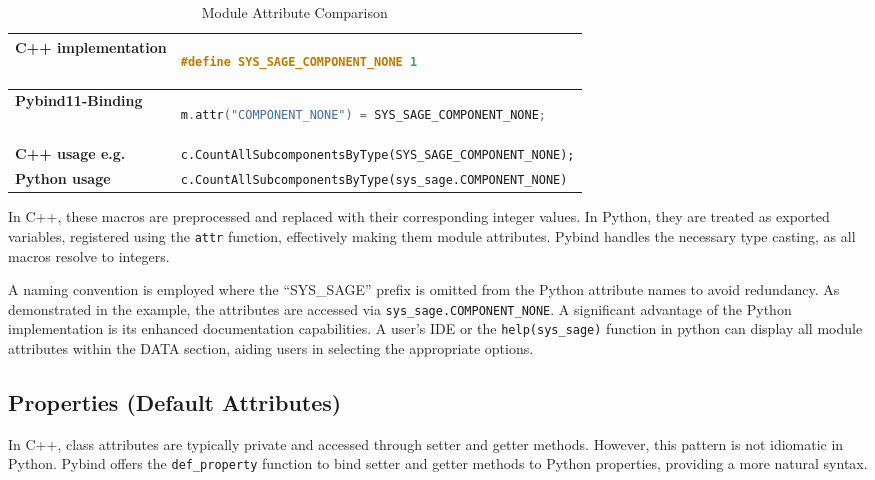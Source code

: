 \begin{table}[htbp]
\centering
\begin{tabular}{|l|l|}
\hline
\textbf{C++ implementation} & \begin{lstlisting}[language=C++]
#define SYS_SAGE_COMPONENT_NONE 1 
\end{lstlisting} \\ \hline
\textbf{Pybind11-Binding} & \begin{lstlisting}[language=C++]
m.attr("COMPONENT_NONE") = SYS_SAGE_COMPONENT_NONE;
\end{lstlisting} \\ \hline
\textbf{C++ usage e.g.} & \verb|c.CountAllSubcomponentsByType(SYS_SAGE_COMPONENT_NONE);| \\ \hline
\textbf{Python usage} & \verb|c.CountAllSubcomponentsByType(sys_sage.COMPONENT_NONE)| \\ \hline
\end{tabular}
\caption{Module Attribute Comparison}
\label{tab:module_attributes}
\end{table}

In C++, these macros are preprocessed and replaced with their corresponding integer values. In Python, they are treated as exported variables, registered using the \verb|attr| function, effectively making them module attributes. Pybind handles the necessary type casting, as all macros resolve to integers.

A naming convention is employed where the “SYS\_SAGE” prefix is omitted from the Python attribute names to avoid redundancy. As demonstrated in the example, the attributes are accessed via \verb|sys_sage.COMPONENT_NONE|.
A significant advantage of the Python implementation is its enhanced documentation capabilities. A user's \ac{IDE} or the \verb|help(sys_sage)| function in python can display all module attributes within the DATA section, aiding users in selecting the appropriate options.

\subsection{Properties (Default Attributes)}

In C++, class attributes are typically private and accessed through setter and getter methods. However, this pattern is not idiomatic in Python. Pybind offers the \verb|def_property| function to bind setter and getter methods to Python properties, providing a more natural syntax.


